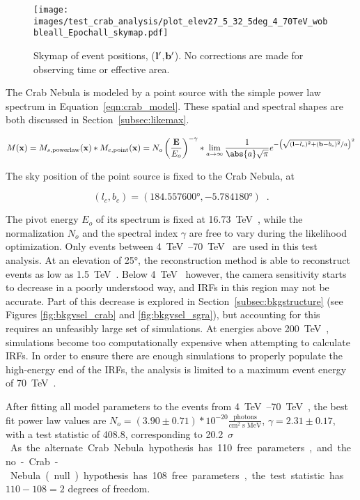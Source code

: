   \begin{figure}[!t]
    \centering
    \texttt{[image: images/test\_crab\_analysis/plot\_elev27\_5\_32\_5deg\_4\_70TeV\_wobbleall\_Epochall\_skymap.pdf]}
    \caption[Crab Nebula Counts Skymap]
    {
      Skymap of event positions, ($\mathbf{l'}$,$\mathbf{b'}$).
      No corrections are made for observing time or effective area.
    }
    \label{fig:crab_skymap}
  \end{figure}
  
  The Crab Nebula is modeled by a point source with the simple power law spectrum in Equation~\ref{eqn:crab_model}.
  These spatial and spectral shapes are both discussed in Section~\ref{subsec:likemax}.

  \begin{equation}\label{eqn:crab_model}
    M(\xtrue) = M_{s,\textrm{powerlaw}}(\xtrue) * M_{e,\textrm{point}}(\xtrue) = N_o \left ( \frac{\Etrue}{E_o} \right )^{-\gamma} * \lim_{a\to\infty} \frac{1}{ \abs{a} \sqrt{\pi} } e^{ - \left ( \sqrt{ (\ltrue-l_c)^2 + (\btrue-b_c)^2 }/a \right )^2 }
  \end{equation}

  The sky position of the point source is fixed to the Crab Nebula, at

  $$(l_c,b_c) = (\ang{184.557600},\ang{-5.784180}) \;\;.$$

  The pivot energy $E_o$ of its spectrum is fixed at \SI{16.73}{\TeV{}}, while the normalization $N_o$ and the spectral index $\gamma$ are free to vary during the likelihood optimization.
  Only events between \SIrange{4}{70}{\TeV{}} are used in this test analysis.
  At an elevation of \ang{25}, the reconstruction method is able to reconstruct events as low as \SI{1.5}{\TeV{}}.
  Below \SI{4}{\TeV{}} however, the camera sensitivity starts to decrease in a poorly understood way, and IRFs in this region may not be accurate.
  Part of this decrease is explored in Section~\ref{subsec:bkgstructure} (see Figures \ref{fig:bkgvsel_crab} and \ref{fig:bkgvsel_sgra}), but accounting for this requires an unfeasibly large set of simulations.
  At energies above \SI{200}{\TeV{}}, simulations become too computationally expensive when attempting to calculate IRFs.
  In order to ensure there are enough simulations to properly populate the high-energy end of the IRFs, the analysis is limited to a maximum event energy of \SI{70}{\TeV{}}.
    
  After fitting all model parameters to the events from \SIrange{4}{70}{\TeV{}}, the best fit power law values are $ N_o = \left(3.90\pm0.71\right)*10^{-20} \frac{\textrm{photons}}{\textrm{cm}^{2} \; \textrm{s} \; \textrm{MeV} } $, $ \gamma = 2.31 \pm 0.17 $, with a test statistic of 408.8, corresponding to \nicetilde{}\SI{20.2}{$\sigma$}.
  As the alternate Crab Nebula hypothesis has 110 free parameters, and the no-Crab-Nebula (null) hypothesis has 108 free parameters, the test statistic has $ 110 - 108 = 2 $ degrees of freedom.
  
